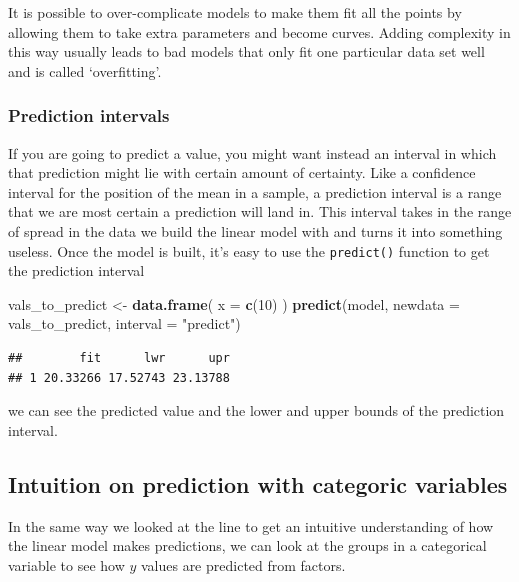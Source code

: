\documentclass[
]{book}
\newenvironment{Shaded}{\begin{snugshade}}{\end{snugshade}}
\newcommand{\DataTypeTok}[1]{\textcolor[rgb]{0.13,0.29,0.53}{#1}}
\newcommand{\DecValTok}[1]{\textcolor[rgb]{0.00,0.00,0.81}{#1}}
\newcommand{\KeywordTok}[1]{\textcolor[rgb]{0.13,0.29,0.53}{\textbf{#1}}}
\newcommand{\NormalTok}[1]{#1}
\newcommand{\StringTok}[1]{\textcolor[rgb]{0.31,0.60,0.02}{#1}}
\newenvironment{sidenote}
{ \begin{tcolorbox}[colbacktitle=blue!50!white,
title=huh?,coltitle=white,
fonttitle=\bfseries] }
{  \end{tcolorbox} }
\begin{document}
\begin{sidenote}
It is possible to over-complicate models to make them fit all the points by allowing them to take extra parameters and become curves. Adding complexity in this way usually leads to bad models that only fit one particular data set well and is called `overfitting'.
\end{sidenote}

\hypertarget{prediction-intervals}{%
\subsubsection{Prediction intervals}\label{prediction-intervals}}

If you are going to predict a value, you might want instead an interval in which that prediction might lie with certain amount of certainty. Like a confidence interval for the position of the mean in a sample, a prediction interval is a range that we are most certain a prediction will land in. This interval takes in the range of spread in the data we build the linear model with and turns it into something useless. Once the model is built, it's easy to use the \texttt{predict()} function to get the prediction interval

\begin{Shaded}
\begin{Highlighting}[]
\NormalTok{vals_to_predict <-}\StringTok{ }\KeywordTok{data.frame}\NormalTok{( }\DataTypeTok{x =} \KeywordTok{c}\NormalTok{(}\DecValTok{10}\NormalTok{) )}
\KeywordTok{predict}\NormalTok{(model, }\DataTypeTok{newdata =}\NormalTok{ vals_to_predict, }\DataTypeTok{interval =} \StringTok{"predict"}\NormalTok{)}
\end{Highlighting}
\end{Shaded}

\begin{verbatim}
##        fit      lwr      upr
## 1 20.33266 17.52743 23.13788
\end{verbatim}

we can see the predicted value and the lower and upper bounds of the prediction interval.

\hypertarget{intuition-on-prediction-with-categoric-variables}{%
\subsection{Intuition on prediction with categoric variables}\label{intuition-on-prediction-with-categoric-variables}}

In the same way we looked at the line to get an intuitive understanding of how the linear model makes predictions, we can look at the groups in a categorical variable to see how \(y\) values are predicted from factors.
\end{document}
